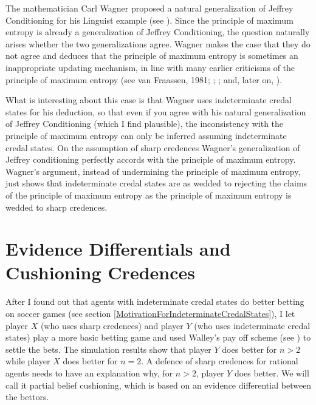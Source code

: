 \documentclass[11pt]{article}
\begin{document}

The mathematician Carl Wagner proposed a natural generalization of
Jeffrey Conditioning for his Linguist example (see
). Since the principle of maximum entropy is
already a generalization of Jeffrey Conditioning, the question
naturally arises whether the two generalizations agree. Wagner makes
the case that they do not agree and deduces that the principle of
maximum entropy is sometimes an inappropriate updating mechanism, in
line with many earlier criticisms of the principle of maximum entropy
(see van Fraassen, 1981; ;
; and, later on,
). 

What is interesting about this case is that Wagner uses indeterminate
credal states for his deduction, so that even if you agree with his
natural generalization of Jeffrey Conditioning (which I find
plausible), the inconsistency with the principle of maximum entropy
can only be inferred assuming indeterminate credal states. On the
assumption of sharp credences Wagner's generalization of Jeffrey
conditioning perfectly accords with the principle of maximum entropy.
Wagner's argument, instead of undermining the principle of maximum
entropy, just shows that indeterminate credal states are as wedded to
rejecting the claims of the principle of maximum entropy as the
principle of maximum entropy is wedded to sharp credences.

\section{Evidence Differentials and Cushioning Credences} 
\label{WalleysWorldCupWoes}

After I found out that agents with indeterminate credal states do
better betting on soccer games (see section
\ref{MotivationForIndeterminateCredalStates}), I let player $X$ (who
uses sharp credences) and player $Y$ (who uses indeterminate credal
states) play a more basic betting game and used Walley's pay off
scheme (see ) to settle the bets. The
simulation results show that player $Y$ does better for $n>2$ while
player $X$ does better for $n=2$. A defence of sharp credences for
rational agents needs to have an explanation why, for $n>2$, player
$Y$ does better. We will call it partial belief cushioning, which is
based on an evidence differential between the bettors.
\end{document}
